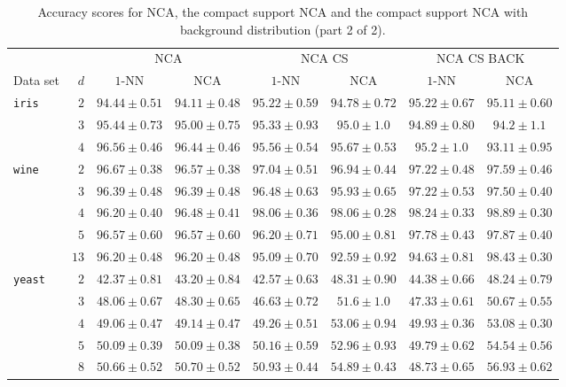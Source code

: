 \begin{landscape}
  \begin{table}
  \centering
    \begin{tabular}{lrcccccc}
    \toprule
	    &     & \multicolumn{2}{c}{NCA}  & \multicolumn{2}{c}{NCA CS} & \multicolumn{2}{c}{NCA CS BACK}\\
    \cmidrule(r){3-4} \cmidrule(r){5-6} \cmidrule(r){7-8}
    Data set & $d$ & $1$-NN & NCA & $1$-NN & NCA & $1$-NN & NCA \\
    \midrule
    \texttt{iris}&$2$&$94.44 \pm 0.51$&$94.11 \pm 0.48$&$95.22 \pm 0.59$&$94.78 \pm 0.72$&$95.22 \pm 0.67$&$95.11 \pm 0.60$\\ 
    &$3$&$95.44 \pm 0.73$&$95.00 \pm 0.75$&$95.33 \pm 0.93$&$95.0 \pm 1.0$&$94.89 \pm 0.80$&$94.2 \pm 1.1$\\ 
    &$4$&$96.56 \pm 0.46$&$96.44 \pm 0.46$&$95.56 \pm 0.54$&$95.67 \pm 0.53$&$95.2 \pm 1.0$&$93.11 \pm 0.95$\\ 
    \midrule
    \texttt{wine}&$2$&$96.67 \pm 0.38$&$96.57 \pm 0.38$&$97.04 \pm 0.51$&$96.94 \pm 0.44$&$97.22 \pm 0.48$&$97.59 \pm 0.46$\\ 
    &$3$&$96.39 \pm 0.48$&$96.39 \pm 0.48$&$96.48 \pm 0.63$&$95.93 \pm 0.65$&$97.22 \pm 0.53$&$97.50 \pm 0.40$\\ 
    &$4$&$96.20 \pm 0.40$&$96.48 \pm 0.41$&$98.06 \pm 0.36$&$98.06 \pm 0.28$&$98.24 \pm 0.33$&$98.89 \pm 0.30$\\ 
    &$5$&$96.57 \pm 0.60$&$96.57 \pm 0.60$&$96.20 \pm 0.71$&$95.00 \pm 0.81$&$97.78 \pm 0.43$&$97.87 \pm 0.40$\\ 
    &$13$&$96.20 \pm 0.48$&$96.20 \pm 0.48$&$95.09 \pm 0.70$&$92.59 \pm 0.92$&$94.63 \pm 0.81$&$98.43 \pm 0.30$\\ 
    \midrule
    \texttt{yeast}&$2$&$42.37 \pm 0.81$&$43.20 \pm 0.84$&$42.57 \pm 0.63$&$48.31 \pm 0.90$&$44.38 \pm 0.66$&$48.24 \pm 0.79$\\ 
    &$3$&$48.06 \pm 0.67$&$48.30 \pm 0.65$&$46.63 \pm 0.72$&$51.6 \pm 1.0$&$47.33 \pm 0.61$&$50.67 \pm 0.55$\\ 
    &$4$&$49.06 \pm 0.47$&$49.14 \pm 0.47$&$49.26 \pm 0.51$&$53.06 \pm 0.94$&$49.93 \pm 0.36$&$53.08 \pm 0.30$\\ 
    &$5$&$50.09 \pm 0.39$&$50.09 \pm 0.38$&$50.16 \pm 0.59$&$52.96 \pm 0.93$&$49.79 \pm 0.62$&$54.54 \pm 0.56$\\ 
    &$8$&$50.66 \pm 0.52$&$50.70 \pm 0.52$&$50.93 \pm 0.44$&$54.89 \pm 0.43$&$48.73 \pm 0.65$&$56.93 \pm 0.62$\\ 
    \bottomrule
    \end{tabular}
  \caption[Accuracy for NCA, the compact support NCA and the compact support NCA with background distribution (part 2 of 2)]{Accuracy scores for NCA, the compact support NCA and the compact support NCA with background distribution (part 2 of 2).}
  \label{app:tab:nca-cs-scores-2}
  \end{table}
\end{landscape}

